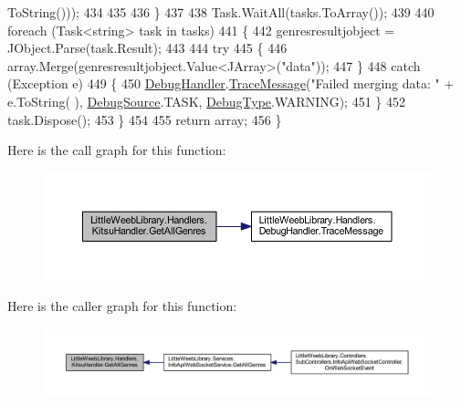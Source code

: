 \begin{DoxyCode}
      ToString()));
434                 
435                
436             \}
437 
438             Task.WaitAll(tasks.ToArray());
439 
440             \textcolor{keywordflow}{foreach} (Task<string> task \textcolor{keywordflow}{in} tasks)
441             \{
442                 genresresultjobject = JObject.Parse(task.Result);
443 
444                 \textcolor{keywordflow}{try}
445                 \{
446                     array.Merge(genresresultjobject.Value<JArray>(\textcolor{stringliteral}{"data"}));
447                 \}
448                 \textcolor{keywordflow}{catch} (Exception e)
449                 \{
450                     \mbox{\hyperlink{class_little_weeb_library_1_1_handlers_1_1_kitsu_handler_a6d3c55fa5eee15320845c2d902c96882}{DebugHandler}}.\mbox{\hyperlink{interface_little_weeb_library_1_1_handlers_1_1_i_debug_handler_a2e405bc3492e683cd3702fae125221bc}{TraceMessage}}(\textcolor{stringliteral}{"Failed merging data: "} + e.ToString(
      ), \mbox{\hyperlink{namespace_little_weeb_library_1_1_handlers_a2a6ca0775121c9c503d58aa254d292be}{DebugSource}}.TASK, \mbox{\hyperlink{namespace_little_weeb_library_1_1_handlers_ab66019ed40462876ec4e61bb3ccb0a62}{DebugType}}.WARNING);
451                 \}
452                 task.Dispose();
453             \}
454 
455             \textcolor{keywordflow}{return} array;
456         \}
\end{DoxyCode}
Here is the call graph for this function\+:\nopagebreak
\begin{figure}[H]
\begin{center}
\leavevmode
\includegraphics[width=350pt]{class_little_weeb_library_1_1_handlers_1_1_kitsu_handler_a528491d8d97584b2ba2c3bfcc4b5772e_cgraph}
\end{center}
\end{figure}
Here is the caller graph for this function\+:\nopagebreak
\begin{figure}[H]
\begin{center}
\leavevmode
\includegraphics[width=350pt]{class_little_weeb_library_1_1_handlers_1_1_kitsu_handler_a528491d8d97584b2ba2c3bfcc4b5772e_icgraph}
\end{center}
\end{figure}
